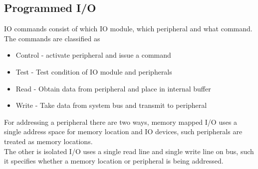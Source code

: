 \documentclass[12pt, a4paper]{article}
\begin{document}
		\subsection{Programmed I/O}
			IO commands consist of which IO module, which peripheral and what command.\\
			The commands are classified as
			\begin{itemize}
				\item Control - activate peripheral and issue a command
				\item Test - Test condition of IO module and peripherals
				\item Read - Obtain data from peripheral and place in internal buffer
				\item Write - Take data from system bus and transmit to peripheral
			\end{itemize}
			For addressing a peripheral there are two ways, memory mapped I/O uses a single address space for memory location and IO devices, such peripherals are treated as memory locations.\\
			The other is isolated I/O uses a single read  line and single write line on bus, such it specifies whether a memory location or peripheral is being addressed. 
\end{document}
